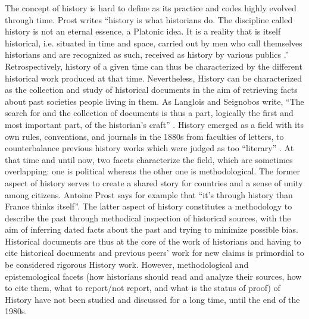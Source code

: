 The concept of history is hard to define as its practice and codes highly evolved through time.
Prost writes ``history is what historians do. The discipline called history is not an eternal essence, a Platonic idea. It is a reality that is itself historical, i.e. situated in time and space, carried out by men who call themselves historians and are recognized as such, received as history by various publics \cite{prost2014}.''
Retrospectively, history of a given time can thus be characterized by the different historical work produced at that time.
Nevertheless, History can be characterized as the collection and study of historical documents in the aim of retrieving facts about past societies people living in them.
As Langlois and Seignobos write, ``The search for and the collection of documents is thus a part, logically the first and most important part, of the historian's craft'' \cite{langloisIntroductionAuxEtudes2014}.
History emerged as a field with its own rules, conventions, and journals in the 1880s from faculties of letters, to counterbalance previous history works which were judged as too ``literary'' \cite{noirielNaissanceMetierHistorien1990}.
At that time and until now, two facets characterize the field, which are sometimes overlapping: one is political whereas the other one is methodological.
The former aspect of history serves to create a shared story for countries and a sense of unity among citizens.
Antoine Prost says for example that ``it's through history than France thinks itself''\cite{prost2014}.
The latter aspect of history constitutes a methodology to describe the past through methodical inspection of historical sources, with the aim of inferring dated facts about the past and trying to minimize possible bias.
Historical documents are thus at the core of the work of historians and having to cite historical documents and previous peers' work for new claims is primordial to be considered rigorous History work.
However, methodological and epistemological facets (how historians should read and analyze their sources, how to cite them, what to report/not report, and what is the status of proof) of History have not been studied and discussed for a long time, until the end of the 1980s\cite{prost2014}.

